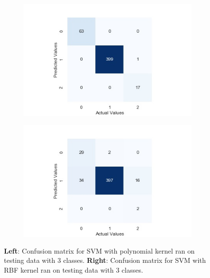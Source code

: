 \documentclass[11pt,a4paper,titlepage]{article}
\begin{document}
	\begin{figure}[H]
		\begin{subfigure}{0.4\textwidth}
			\includegraphics[scale=0.5]{img/threeclass_svmpoly.jpg}
		\end{subfigure}
		\begin{subfigure}{0.4\textwidth}
			\includegraphics[scale=0.5]{img/threeclass_svmrbf.jpg}
		\end{subfigure}
		\caption{\textbf{Left}: Confusion matrix for SVM with polynomial kernel ran on testing data with 3 classes. \textbf{Right}: Confusion matrix for SVM with RBF kernel ran on testing data with 3 classes.}
	\end{figure}
\end{document}
